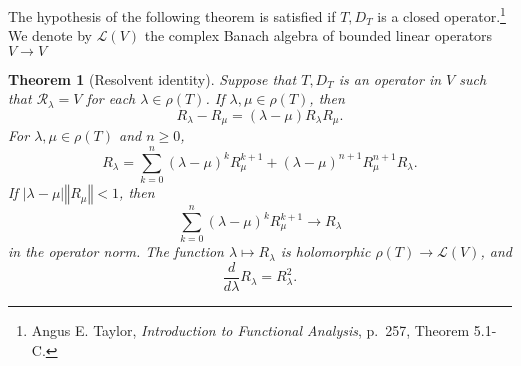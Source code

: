 \documentclass{article}
\newcommand{\norm}[1]{\left\Vert #1 \right\Vert}
\newtheorem{theorem}{Theorem}
\theoremstyle{definition}
\begin{document}
The hypothesis of the following theorem is satisfied if $T,D_T$ is a closed
operator.\footnote{Angus E. Taylor, {\em Introduction to Functional Analysis}, p.~257, Theorem 5.1-C.}
We denote by $\mathscr{L}(V)$ the complex Banach algebra of bounded linear operators $V \to V$


\begin{theorem}[Resolvent identity]
Suppose that $T,D_T$ is an operator in $V$
such that $\mathscr{R}_\lambda = V$ for each $\lambda \in \rho(T)$. 
If $\lambda,\mu \in \rho(T)$, then 
\[
R_\lambda - R_\mu = (\lambda-\mu)R_\lambda R_\mu.
\]
For $\lambda,\mu \in \rho(T)$ and $n \geq 0$,
\begin{equation}
R_\lambda = \sum_{k=0}^n (\lambda-\mu)^k R_\mu^{k+1}+(\lambda-\mu)^{n+1}R_\mu^{n+1}R_\lambda.
\label{resolventsum}
\end{equation}
If $|\lambda-\mu| \norm{R_\mu}<1$, then
\[
\sum_{k=0}^n (\lambda-\mu)^k R_\mu^{k+1} \to R_\lambda
\]
in the operator norm.
The function $\lambda \mapsto R_\lambda$ is holomorphic $\rho(T) \to \mathscr{L}(V)$,
and
\[
\frac{d}{d\lambda} R_\lambda = R_\lambda^2.
\]
\label{resolventidentity}
\end{theorem}
\end{document}
